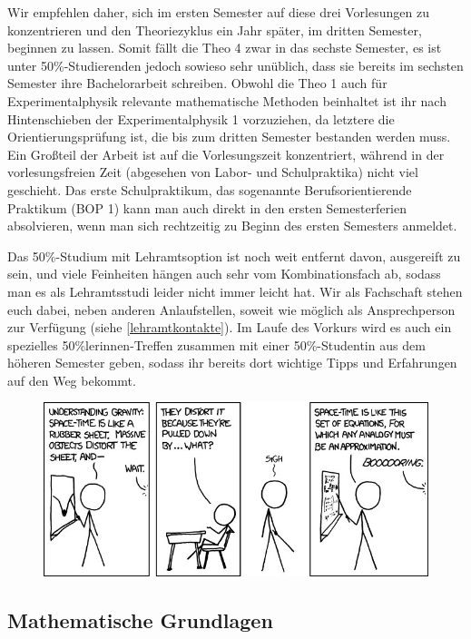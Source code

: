 Wir empfehlen daher, sich im ersten Semester auf diese drei Vorlesungen zu konzentrieren und den Theoriezyklus ein Jahr später, im dritten Semester, beginnen zu lassen. Somit fällt die Theo 4 zwar in das sechste Semester, es ist unter 50\%-Studierenden jedoch sowieso sehr unüblich, dass sie bereits im sechsten Semester ihre Bachelorarbeit schreiben. Obwohl die Theo 1 auch für Experimentalphysik relevante mathematische Methoden beinhaltet ist ihr nach Hintenschieben der Experimentalphysik 1 vorzuziehen, da letztere die Orientierungsprüfung ist, die bis zum dritten Semester bestanden werden muss. Ein Großteil der Arbeit ist auf die Vorlesungszeit konzentriert, während in der vorlesungsfreien Zeit (abgesehen von Labor- und Schulpraktika) nicht viel geschieht. Das erste Schulpraktikum, das sogenannte Berufsorientierende Praktikum (BOP 1) kann man auch direkt in den ersten Semesterferien absolvieren, wenn man sich rechtzeitig zu Beginn des ersten Semesters anmeldet.

Das 50\%-Studium mit Lehramtsoption ist noch weit entfernt davon, ausgereift zu sein, und viele Feinheiten hängen auch sehr vom Kombinationsfach ab, sodass man es als Lehramtsstudi leider nicht immer leicht hat. Wir als Fachschaft stehen euch dabei, neben anderen Anlaufstellen, soweit wie möglich als Ansprechperson zur Verfügung (siehe \autoref{lehramtkontakte}). Im Laufe des Vorkurs wird es auch ein spezielles 50\%lerinnen-Treffen zusammen mit einer 50\%-Studentin aus dem höheren Semester geben, sodass ihr bereits dort wichtige Tipps und Erfahrungen auf den Weg bekommt. 

\begin{figure}[b]
\centering
\includegraphics[width=\textwidth]{bilder/teaching_physics.jpg}
\end{figure}


\subsection{Mathematische Grundlagen}

